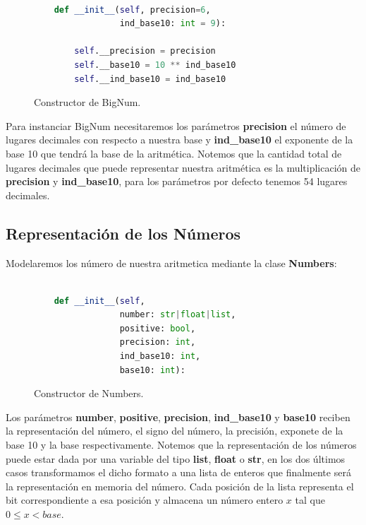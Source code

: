 \documentclass[a4paper,10pt,twocolumn]{article}
\begin{document}
  

		\begin{figure}[htb]%
			\begin{lstlisting}[language=python]%

    def __init__(self, precision=6,
                 ind_base10: int = 9):
                 
        self.__precision = precision
        self.__base10 = 10 ** ind_base10
        self.__ind_base10 = ind_base10


			\end{lstlisting}
		\caption{Constructor de BigNum.\label{fig:code}}
		\end{figure}
	
	Para instanciar BigNum necesitaremos los parámetros \textbf{precision} el número de lugares decimales con respecto a nuestra base y \textbf{ind\_base10} el exponente de la base 10 que tendrá la base de la aritmética. Notemos que la cantidad total de lugares decimales que puede representar nuestra aritmética es la multiplicación de
\textbf{precision} y  \textbf{ind\_base10}, para los parámetros por defecto tenemos 54 lugares decimales.
  
	
\subsection{Representación de los Números}\label{sub:representation}
	Modelaremos los número de nuestra aritmetica mediante la clase \textbf{Numbers}:

		\begin{figure}[htb]%
			\begin{lstlisting}[language=python]%

    def __init__(self, 
                 number: str|float|list,         
                 positive: bool, 
                 precision: int, 
                 ind_base10: int, 
                 base10: int):

			\end{lstlisting}
		\caption{Constructor de Numbers.\label{fig:code}}
		\end{figure}
	
	Los parámetros \textbf{number}, \textbf{positive}, \textbf{precision}, \textbf{ind\_base10} y \textbf{base10} 
  reciben la representación del número, el signo del número, la precisión, exponete de la base 10 y la base respectivamente. Notemos que la representación de los números puede estar dada por una variable del tipo \textbf{list}, \textbf{float} o \textbf{str}, en los dos últimos casos transformamos el dicho formato a  una lista de enteros que finalmente será la representación en memoria del número. Cada posición de la lista representa el bit correspondiente a esa posición y almacena un número entero $x$ tal que $0\leq x <base$.  
  
\end{document}
